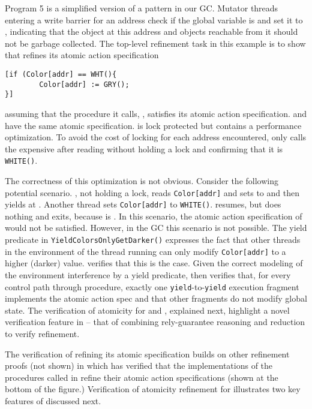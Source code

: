 Program 5 is a simplified version of a pattern in our GC.
Mutator threads entering a write barrier for an
address  check
if the global variable  is 
and set it to , indicating that the object at this address
and objects reachable from it should not be garbage collected. The
top-level refinement task in this example is to show that 
refines its atomic action specification 
\begin{verbatim}
[if (Color[addr] == WHT(){
        Color[addr] := GRY();
}]
\end{verbatim}
assuming that the procedure it calls, , satisfies its
atomic action specification.  and  have the same atomic
specification.   is lock protected but  contains a
performance optimization. 
To avoid the cost of locking for each
address encountered, 
 only calls the expensive 
 after reading  without holding a lock
and confirming that it is {\tt WHITE()}.


The correctness of this
optimization is not obvious. Consider the following potential
scenario. , not holding a lock, reads {\tt Color[addr]} and
sets  to  and then yields at
. Another thread sets {\tt Color[addr]} to
{\tt WHITE()}.  resumes, but does nothing and exits,
because  is . In this scenario, the atomic action
specification of  would not be satisfied. However, in the GC this
scenario is not possible. 
The yield
predicate in {\tt YieldColorsOnlyGetDarker()} expresses the fact that
other threads in the environment of the thread running  can
only modify {\tt Color[addr]} to a higher (darker)
value. \civl verifies that this is the case. Given the correct
modeling of the environment interference by a yield predicate,
\civl then verifies that, for every control path through 
procedure, exactly one {\tt yield}-to-{\tt yield} execution
fragment implements the atomic action spec and that other fragments do not modify
global state. The verification of atomicity for  and
, explained next, highlight a
novel verification feature in \civl -- that of combining
rely-guarantee reasoning and reduction to verify refinement.

The verification of  refining its atomic specification
builds on other refinement proofs (not shown) in which \civl has
verified that the implementations of the procedures called in
 refine their atomic action specifications (shown at the
bottom of the figure.) Verification of atomicity refinement for
 illustrates two key features of \civl discussed next. 

